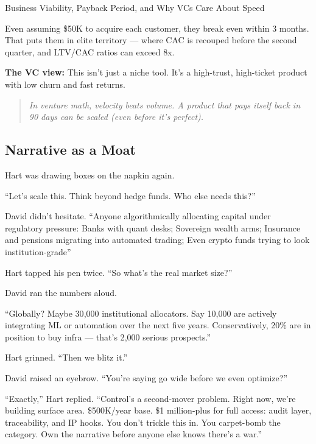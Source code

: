 \begin{TechnicalSidebar}{Business Viability, Payback Period, and Why VCs Care About Speed}
  \medskip
  
  Even assuming \$50K to acquire each customer, they break even within 3 months.  
  That puts them in elite territory — where CAC is recouped before the second quarter, and LTV/CAC ratios can exceed 8x.
  
  \medskip
  
  \textbf{The VC view:}  
  This isn’t just a niche tool. It’s a high-trust, high-ticket product with low churn and fast returns.
  
  \begin{quote}
  \textit{In venture math, velocity beats volume.  
  A product that pays itself back in 90 days can be scaled   
  (even before it's perfect).}
  \end{quote}
  
\end{TechnicalSidebar}
  

\medskip

\subsection{Narrative as a Moat}


Hart was drawing boxes on the napkin again.

``Let’s scale this. Think beyond hedge funds. Who else needs this?''

David didn’t hesitate.  
``Anyone algorithmically allocating capital under regulatory pressure:
  Banks with quant desks;  
  Sovereign wealth arms; 
  Insurance and pensions migrating into automated trading; 
  Even crypto funds trying to look institution-grade''

Hart tapped his pen twice. ``So what’s the real market size?''

David ran the numbers aloud.

``Globally? Maybe 30{,}000 institutional allocators.  
Say 10{,}000 are actively integrating ML or automation over the next five years.  
Conservatively, 20\% are in position to buy infra — that’s 2{,}000 serious prospects.''

Hart grinned. ``Then we blitz it.''

David raised an eyebrow. ``You’re saying go wide before we even optimize?''

``Exactly,'' Hart replied. ``Control’s a second-mover problem.  
Right now, we’re building surface area. \$500K/year base. \$1 million-plus for full access: audit layer, 
traceability, and IP hooks.  
You don’t trickle this in. You carpet-bomb the category. Own the narrative before anyone else knows 
there’s a war.''


